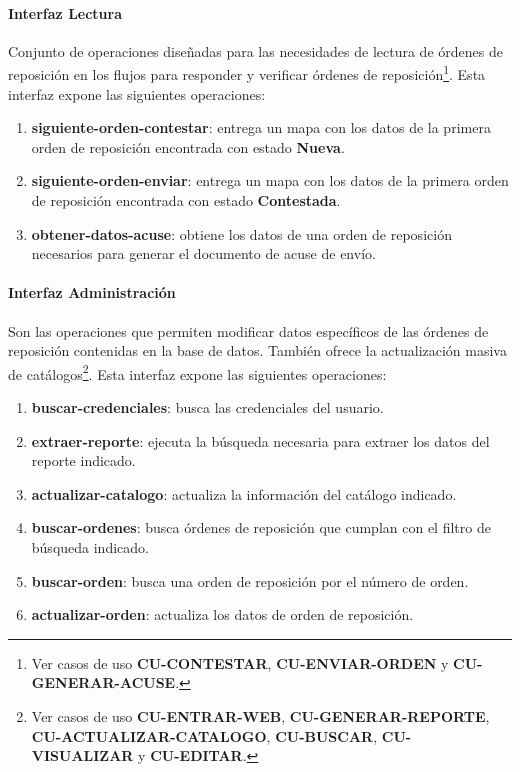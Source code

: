 \paragraph{\indent Interfaz Lectura\\}
Conjunto de operaciones diseñadas para las necesidades de lectura de órdenes de reposición en los flujos para responder y verificar órdenes de reposición\footnote{Ver casos de uso \textbf{CU-CONTESTAR}, \textbf{CU-ENVIAR-ORDEN} y \textbf{CU-GENERAR-ACUSE}.}. Esta interfaz expone las siguientes operaciones:
\begin{enumerate}
	\item \textbf{siguiente-orden-contestar}: entrega un mapa con los datos de la primera orden de reposición encontrada con estado \textbf{Nueva}.
	\item \textbf{siguiente-orden-enviar}: entrega un mapa con los datos de la primera orden de reposición encontrada con estado \textbf{Contestada}.
	\item \textbf{obtener-datos-acuse}: obtiene los datos de una orden de reposición necesarios para generar el documento de acuse de envío.
\end{enumerate}
\paragraph{\indent Interfaz Administración\\}
Son las operaciones que permiten modificar datos específicos de las órdenes de reposición contenidas en la base de datos. También ofrece la actualización masiva de catálogos\footnote{Ver casos de uso \textbf{CU-ENTRAR-WEB}, \textbf{CU-GENERAR-REPORTE}, \textbf{CU-ACTUALIZAR-CATALOGO}, \textbf{CU-BUSCAR}, \textbf{CU-VISUALIZAR} y \textbf{CU-EDITAR}.}. Esta interfaz expone las siguientes operaciones:
\begin{enumerate}
	\item \textbf{buscar-credenciales}: busca las credenciales del usuario.
	\item \textbf{extraer-reporte}: ejecuta la búsqueda necesaria para extraer los datos del reporte indicado.
	\item \textbf{actualizar-catalogo}: actualiza la información del catálogo indicado.
	\item \textbf{buscar-ordenes}: busca órdenes de reposición que cumplan con el filtro de búsqueda indicado.
	\item \textbf{buscar-orden}: busca una orden de reposición por el número de orden.
	\item \textbf{actualizar-orden}: actualiza los datos de orden de reposición.
\end{enumerate}
